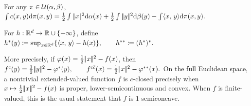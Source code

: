 For any $\pi\in\mathcal{U}(\alpha,\beta)$, \(\int c(x,y)\mathrm{d}\pi(x,y) = \frac12\int|\!| x |\!|^2\mathrm{d}\alpha(x) +\frac12\int|\!| y |\!|^2\mathrm{d}\beta(y) -\int \langle x,\,y\rangle\mathrm{d}\pi(x,y).\)
\begin{defn}\label{def-legendre-fenchel-transform}
For $h:\mathbb{R}^d\to\mathbb{R}\cup\{+\infty\}$, define
\(h^*(y)\coloneqq\sup_{x\in\mathbb{R}^d}\{\langle x,\,y\rangle-h(x)\}, \qquad h^{**}\coloneqq(h^*)^*.\)
\end{defn}
More precisely, if $\varphi(x)=\frac12|\!| x |\!|^2-f(x)$, then
\(f^c(y) = \frac12|\!| y |\!|^2-\varphi^*(y), \qquad f^{c\bar c}(x) = \frac12|\!| x |\!|^2-\varphi^{**}(x).\)
On the full Euclidean space, a nontrivial extended-valued function $f$ is $c$-closed precisely when $x\mapsto\frac12|\!| x |\!|^2-f(x)$ is proper, lower-semicontinuous and convex. When $f$ is finite-valued, this is the usual statement that $f$ is $1$-semiconcave.

